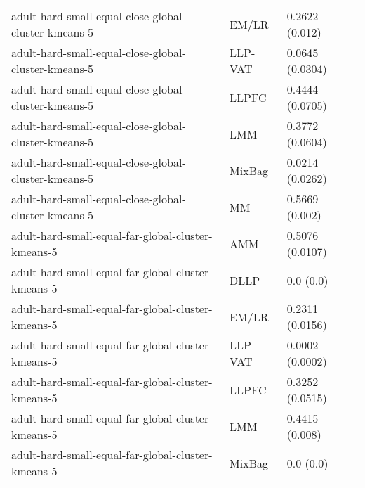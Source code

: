 \begin{longtable}{lll}
                                                         adult-hard-small-equal-close-global-cluster-kmeans-5 &     EM/LR &                            0.2622 (0.012) \\
                                                         adult-hard-small-equal-close-global-cluster-kmeans-5 &   LLP-VAT &                           0.0645 (0.0304) \\
                                                         adult-hard-small-equal-close-global-cluster-kmeans-5 &     LLPFC &                           0.4444 (0.0705) \\
                                                         adult-hard-small-equal-close-global-cluster-kmeans-5 &       LMM &                           0.3772 (0.0604) \\
                                                         adult-hard-small-equal-close-global-cluster-kmeans-5 &    MixBag &                           0.0214 (0.0262) \\
                                                         adult-hard-small-equal-close-global-cluster-kmeans-5 &        MM &                            0.5669 (0.002) \\
                                                           adult-hard-small-equal-far-global-cluster-kmeans-5 &       AMM &                           0.5076 (0.0107) \\
                                                           adult-hard-small-equal-far-global-cluster-kmeans-5 &      DLLP &                                 0.0 (0.0) \\
                                                           adult-hard-small-equal-far-global-cluster-kmeans-5 &     EM/LR &                           0.2311 (0.0156) \\
                                                           adult-hard-small-equal-far-global-cluster-kmeans-5 &   LLP-VAT &                           0.0002 (0.0002) \\
                                                           adult-hard-small-equal-far-global-cluster-kmeans-5 &     LLPFC &                           0.3252 (0.0515) \\
                                                           adult-hard-small-equal-far-global-cluster-kmeans-5 &       LMM &                            0.4415 (0.008) \\
                                                           adult-hard-small-equal-far-global-cluster-kmeans-5 &    MixBag &                                 0.0 (0.0) \\

\end{longtable}
